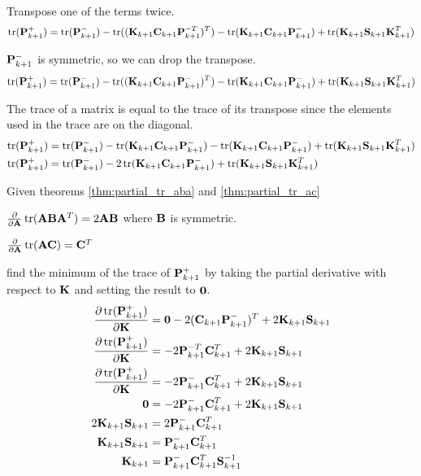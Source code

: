 Transpose one of the terms twice.
\begin{equation*}
  \operatorname{tr}(\mathbf{P}_{k+1}^+) = \operatorname{tr}(\mathbf{P}_{k+1}^-) -
    \operatorname{tr}((\mathbf{K}_{k+1}\mathbf{C}_{k+1}\mathbf{P}_{k+1}^{-T})^T) -
    \operatorname{tr}(\mathbf{K}_{k+1}\mathbf{C}_{k+1}\mathbf{P}_{k+1}^-) +
    \operatorname{tr}(\mathbf{K}_{k+1}\mathbf{S}_{k+1}\mathbf{K}_{k+1}^T)
\end{equation*}

$\mathbf{P}_{k+1}^-$ is symmetric, so we can drop the transpose.
\begin{equation*}
  \operatorname{tr}(\mathbf{P}_{k+1}^+) = \operatorname{tr}(\mathbf{P}_{k+1}^-) -
    \operatorname{tr}((\mathbf{K}_{k+1}\mathbf{C}_{k+1}\mathbf{P}_{k+1}^-)^T) -
    \operatorname{tr}(\mathbf{K}_{k+1}\mathbf{C}_{k+1}\mathbf{P}_{k+1}^-) +
    \operatorname{tr}(\mathbf{K}_{k+1}\mathbf{S}_{k+1}\mathbf{K}_{k+1}^T)
\end{equation*}

The trace of a matrix is equal to the trace of its transpose since the elements
used in the trace are on the diagonal.
\begin{align*}
  \operatorname{tr}(\mathbf{P}_{k+1}^+) &= \operatorname{tr}(\mathbf{P}_{k+1}^-) -
    \operatorname{tr}(\mathbf{K}_{k+1}\mathbf{C}_{k+1}\mathbf{P}_{k+1}^-) -
    \operatorname{tr}(\mathbf{K}_{k+1}\mathbf{C}_{k+1}\mathbf{P}_{k+1}^-) +
    \operatorname{tr}(\mathbf{K}_{k+1}\mathbf{S}_{k+1}\mathbf{K}_{k+1}^T) \\
  \operatorname{tr}(\mathbf{P}_{k+1}^+) &= \operatorname{tr}(\mathbf{P}_{k+1}^-) -
    2\operatorname{tr}(\mathbf{K}_{k+1}\mathbf{C}_{k+1}\mathbf{P}_{k+1}^-) +
    \operatorname{tr}(\mathbf{K}_{k+1}\mathbf{S}_{k+1}\mathbf{K}_{k+1}^T)
\end{align*}

Given theorems \ref{thm:partial_tr_aba} and \ref{thm:partial_tr_ac}
\begin{theorem}
  \label{thm:partial_tr_aba}

  $\frac{\partial}{\partial\mathbf{A}}\operatorname{tr}(\mathbf{A}\mathbf{B}\mathbf{A}^T) =
    2\mathbf{A}\mathbf{B}$ where $\mathbf{B}$ is symmetric.
\end{theorem}
\begin{theorem}
  \label{thm:partial_tr_ac}

  $\frac{\partial}{\partial\mathbf{A}}\operatorname{tr}(\mathbf{A}\mathbf{C}) = \mathbf{C}^T$
\end{theorem}

find the minimum of the trace of $\mathbf{P}_{k+1}^+$ by taking the partial
derivative with respect to $\mathbf{K}$ and setting the result to $\mathbf{0}$.
\begin{align*}
  \frac{\partial\operatorname{tr}(\mathbf{P}_{k+1}^+)}{\partial\mathbf{K}} &=
    \mathbf{0} - 2(\mathbf{C}_{k+1}\mathbf{P}_{k+1}^-)^T + 2\mathbf{K}_{k+1}\mathbf{S}_{k+1} \\
  \frac{\partial\operatorname{tr}(\mathbf{P}_{k+1}^+)}{\partial\mathbf{K}} &=
    -2\mathbf{P}_{k+1}^{-T}\mathbf{C}_{k+1}^T + 2\mathbf{K}_{k+1}\mathbf{S}_{k+1} \\
  \frac{\partial\operatorname{tr}(\mathbf{P}_{k+1}^+)}{\partial\mathbf{K}} &=
    -2\mathbf{P}_{k+1}^-\mathbf{C}_{k+1}^T + 2\mathbf{K}_{k+1}\mathbf{S}_{k+1} \\
  \mathbf{0} &= -2\mathbf{P}_{k+1}^-\mathbf{C}_{k+1}^T + 2\mathbf{K}_{k+1}\mathbf{S}_{k+1} \\
  2\mathbf{K}_{k+1}\mathbf{S}_{k+1} &= 2\mathbf{P}_{k+1}^-\mathbf{C}_{k+1}^T \\
  \mathbf{K}_{k+1}\mathbf{S}_{k+1} &= \mathbf{P}_{k+1}^-\mathbf{C}_{k+1}^T \\
  \mathbf{K}_{k+1} &= \mathbf{P}_{k+1}^-\mathbf{C}_{k+1}^T\mathbf{S}_{k+1}^{-1}
\end{align*}

